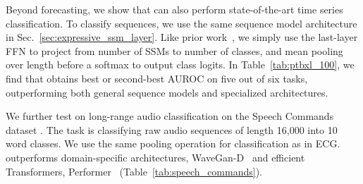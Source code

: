  Beyond forecasting, we show that \ourmethod{} can also perform state-of-the-art time series classification. To classify sequences, we use the same sequence model architecture in Sec.~\ref{sec:expressive_ssm_layer}. Like prior work~\citep{gu2021efficiently}, we simply use the last-layer FFN to project from number of SSMs to number of classes, and mean pooling over length before a softmax to output class logits. 
%
In Table~\ref{tab:ptbxl_100}, we find that \ourmethod{} obtains best or second-best AUROC on five out of six tasks, outperforming both general sequence models and specialized architectures. 

 We further test \ourmethod{} on long-range audio classification on the Speech Commands dataset \citep{warden2018speech}. The task is classifying raw audio sequences of length 16,000 into 10 word classes.
We use the same pooling operation for classification as in ECG. \ourmethod{} outperforms domain-specific architectures, \eg{} WaveGan-D~\citep{donahue2018adversarial}  and efficient Transformers, \eg{} Performer~\citep{choromanski2020rethinking} (Table~\ref{tab:speech_commands}).

%




